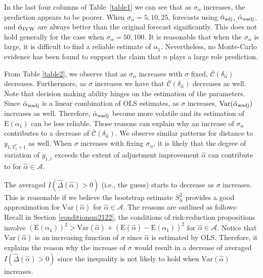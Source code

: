 \documentclass[11pt,3p,review,authoryear]{elsarticle}
\def\mc#1{\mathcal{#1}} %
\def\E#1{\mathrm{E}(#1)} %
\def\var#1{\mathrm{Var}(#1)} %
\theoremstyle{definition}
\begin{document}
In the last four columns of Table~\ref{table1} we can see that as $\sigma_{\alpha}$ increases, the prediction appears to be poorer. When $\sigma_{\alpha}= 5, 10, 25$, forecasts using $\hat{\alpha}_{\rm adj}$, $\hat{\alpha}_{\rm wadj}$, and $\hat{\alpha}_{\rm IVW}$ are always better than the original forecast significantly. This does not hold generally for the case when $\sigma_{\alpha}=50, 100$. It is reasonable that when the $\sigma_{\alpha}$ is large, it is difficult to find a reliable estimate of $\alpha_1$.  Nevertheless, no Monte-Carlo evidence has been found to support the claim that $n$ plays a large role prediction. 



From Table \ref{table2}, we observe that as $\sigma_{\alpha}$ increases with $\sigma$ fixed, $\bar{\mc{C}}(\delta_{\hat{\alpha}})$ decreases. Furthermore, as $\sigma$ increases we have that $\bar{\mc{C}}(\delta_{\hat{\alpha}})$ decreases as well. Note that decision making ability hinges on the estimation of the parameters. Since $\hat{\alpha}_{\rm wadj}$  is a linear combination of OLS estimates, as $\sigma$ increases, $\var{\hat{\alpha}_{\rm wadj}}$ increases as well. Therefore, $\hat{\alpha}_{\rm wadj}$ become more volatile and its estimation of $\E{\alpha_1}$ can be less reliable. Those reasons can explain  why an increase of $\sigma_{\alpha}$ contributes to a decrease of  $\bar{\mc{C}}(\delta_{\hat{\alpha}})$.  We observe similar patterns for distance to $y_{1, T_1^*+1}$ as well. When $\sigma$ increases with fixing $\sigma_{\alpha}$, it is likely that the degree of variation of $y_{1,t}$ exceeds the extent of adjustment improvement $\hat{\alpha}$ can contribute to for $\hat{\alpha}\in \mc{A}$.

The averaged $I(\hat{\Delta}(\hat{\alpha})>0)$ (i.e., the guess) starts to decrease as $\sigma$ increases. This is reasonable if we believe the bootstrap estimate $S^2_{\hat{\alpha}}$ provides a good approximation for $\var{\hat{\alpha}}$ for $\hat{\alpha}\in \mc{A}$. The reasons are outlined as follows: Recall in Section \ref{conditionsm2122}, the conditions of risk-reduction propositions involve $(\E{\alpha_1})^2 > \var{\hat{\alpha}} + (\E{\hat{\alpha}}-\E{\alpha_1})^2$ for $\hat{\alpha}\in \mc{A}$. Notice that $\var{\hat{\alpha}}$ is an increasing function of $\sigma$ since $\hat{\alpha}$ is estimated by OLS. Therefore, it explains the reason why the increase of $\sigma$ would result in a decrease of averaged $I(\hat{\Delta}(\hat{\alpha})>0)$ since the inequality is not likely to hold when  $\var{\hat{\alpha}}$ increases.
\end{document}
